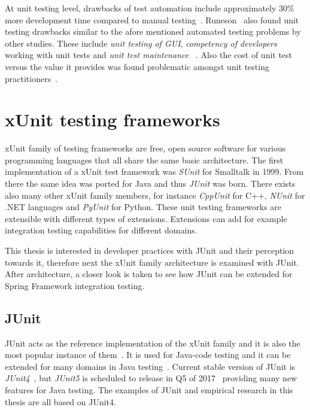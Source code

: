     At unit testing level, drawbacks of test automation include approximately 30\% more development time compared to manual testing~\cite{williams2009effectiveness}.
    Runeson~\cite{runeson2006survey} also found unit testing drawbacks similar to the afore mentioned automated testing problems by other studies.
    These include \textit{unit testing of GUI}, \textit{competency of developers} working with unit tests and \textit{unit test maintenance}~\cite{runeson2006survey} .
    Also the cost of unit test versus the value it provides was found problematic amongst unit testing practitioners~\cite{runeson2006survey}.

\section{xUnit testing frameworks} %
    xUnit family of testing frameworks are free, open source software for various programming languages that
    all share the same basic architecture. The first implementation of a xUnit test framework was \textit{SUnit}
    for Smalltalk in 1999.  From there the same idea was ported for Java and thus \textit{JUnit} was born. There exists also many other
    xUnit family members, for instance \textit{CppUnit} for C++, \textit{NUnit} for .NET languages and \textit{PyUnit} for Python.
    These unit testing frameworks are extensible with different types of extensions. Extensions can add for example integration testing capabilities
    for different domains. ~\cite{hamill2004unit}

    This thesis is interested in developer practices with JUnit and their perception towards it, therefore next the xUnit family architecture
    is examined with JUnit. After architecture, a closer look is taken to see how JUnit can be extended for Spring Framework
    integration testing.

    \subsection{JUnit}
    JUnit acts as the reference implementation of the xUnit family and it is also the most popular instance of them~\cite{hamill2004unit}.
    It is used for Java-code testing and it can be extended for many domains in Java testing~\cite{hamill2004unit}.
    Current stable version of JUnit is \textit{JUnit4}~\cite{junit4}, but \textit{JUnit5} is scheduled to release in Q5 of 2017~\cite{junit5schedule}
    providing many new features for Java testing. The examples of JUnit and empirical research in this thesis are all based on JUnit4.

